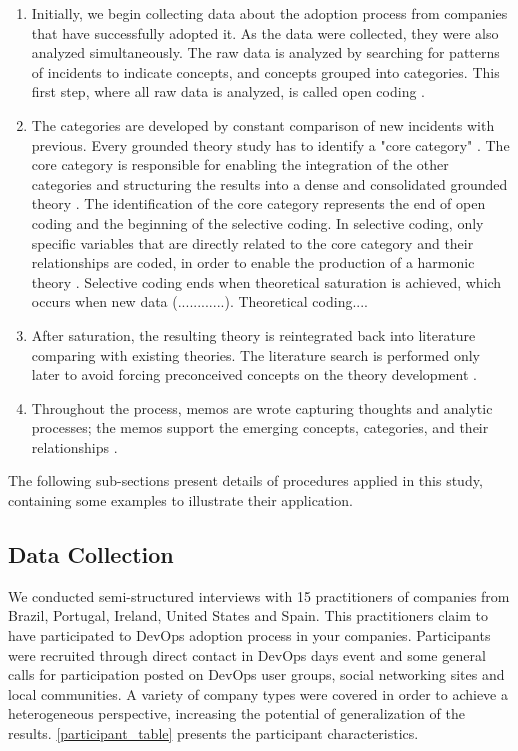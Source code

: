 \begin{enumerate}[label=(\Alph*)]
\item Initially, we begin collecting data about the adoption process from
companies that have successfully adopted it. As the data were collected, they
were also analyzed simultaneously. The raw data is analyzed by searching for
patterns of incidents to indicate concepts, and concepts grouped into
categories. This first step, where all raw data is analyzed, is called open
coding \cite{stol2016grounded}.

\item The categories are developed by constant comparison of new incidents with
previous. Every grounded theory study has to identify a "core category"
\cite{stol2016grounded}. The core category is responsible for enabling the
integration of the other categories and structuring the results into a dense
and consolidated grounded theory \cite{jantunen2014using}. The identification
of the core category represents the end of open coding and the beginning of the
selective coding. In selective coding, only specific variables that are
directly related to the core category and their relationships are coded, in
order to enable the production of a harmonic theory \cite{coleman2007using}
\cite{hoda2011impact}. Selective coding ends when theoretical saturation is achieved, which occurs when new data (............). Theoretical coding....

\item After saturation, the resulting theory is reintegrated back into
literature comparing with existing theories. The literature search is performed
only later to avoid forcing preconceived concepts on the theory development
\cite{adolph2012reconciling}.

\item Throughout the process, memos are wrote capturing thoughts and analytic
processes; the memos support the emerging concepts, categories, and their
relationships \cite{adolph2012reconciling}.

\end{enumerate}

The following sub-sections present details of procedures applied in this study,
containing some examples to illustrate their application.

\subsection{Data Collection}
We conducted semi-structured interviews with 15 practitioners of companies from
Brazil, Portugal, Ireland, United States and Spain. This practitioners claim
to have participated to DevOps adoption process in your companies. Participants
were recruited through direct contact in DevOps days event and some general
calls for participation posted on DevOps user groups, social networking sites
and local communities. A variety of company types were covered in order to
achieve a heterogeneous perspective, increasing the potential of generalization
of the results. \ref{participant_table} presents the participant
characteristics.


